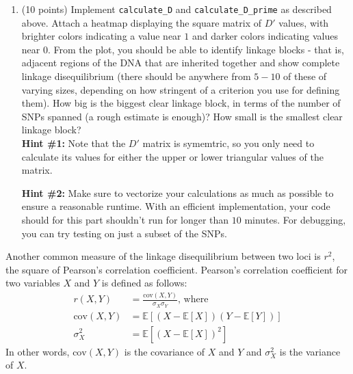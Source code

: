 \begin{enumerate}[resume]
    \item (10 points) Implement \texttt{calculate\_D} and \texttt{calculate\_D\_prime} as described above. Attach a heatmap displaying the square matrix of $D'$ values, with brighter colors indicating a value near $1$ and darker colors indicating values near $0$. From the plot, you should be able to identify linkage blocks - that is, adjacent regions of the DNA that are inherited together and show complete linkage disequilibrium (there should be anywhere from $5 - 10$ of these of varying sizes, depending on how stringent of a criterion you use for defining them). How big is the biggest clear linkage block, in terms of the number of SNPs spanned (a rough estimate is enough)? How small is the smallest clear linkage block? \\
    
    \textbf{Hint \#1:} Note that the $D'$ matrix is symemtric, so you only need to calculate its values for either the upper or lower triangular values of the matrix.
    
    \textbf{Hint \#2:} Make sure to vectorize your calculations as much as possible to ensure a reasonable runtime. With an efficient implementation, your code should for this part shouldn't run for longer than $10$ minutes. For debugging, you can try testing on just a subset of the SNPs.

    \begin{solution}
    \end{solution}
\end{enumerate}

Another common measure of the linkage disequilibrium between two loci is $r^2$, the square of Pearson's correlation coefficient. Pearson's correlation coefficient for two variables $X$ and $Y$ is defined as follows:
\begin{align*}
    r(X, Y) &= \frac{\text{cov}(X, Y)}{\sigma_{X}\sigma_{Y}}\text{, where} \\
    \text{cov}(X, Y) &= \mathbb{E}[(X - \mathbb{E}[X])(Y - \mathbb{E}[Y])] \\
    \sigma^2_{X} &= \mathbb{E}[(X - \mathbb{E}[X])^2] 
\end{align*}
In other words, $\text{cov}(X, Y)$ is the covariance of $X$ and $Y$ and $\sigma^2_{X}$ is the variance of $X$.\\


